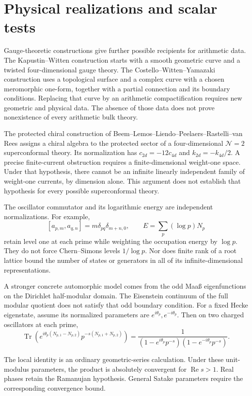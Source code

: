 \section{Physical realizations and scalar tests}
\label{v4-arith:ic:physical}

Gauge-theoretic constructions give further possible recipients
for arithmetic data.
The Kapustin--Witten construction starts with a smooth geometric
curve and a twisted four-dimensional gauge theory.
The Costello--Witten--Yamazaki construction uses a topological
surface and a complex curve with a chosen meromorphic one-form,
together with a partial connection and its boundary conditions.
Replacing that curve by an arithmetic compactification requires
new geometric and physical data.
The absence of those data does not prove nonexistence of every
arithmetic bulk theory.

The protected chiral construction of
Beem--Lemos--Liendo--Peelaers--Rastelli--van Rees assigns a chiral
algebra to the protected sector of a four-dimensional
\(\mathcal N=2\) superconformal theory.
Its normalization has
\(c_{2d}=-12c_{4d}\) and \(k_{2d}=-k_{4d}/2\).
A precise finite-current obstruction requires a finite-dimensional
weight-one space. Under that hypothesis, there cannot be an
infinite linearly independent family of weight-one currents,
by dimension alone.
This argument does not establish that hypothesis for every
possible superconformal theory.

The oscillator commutator and its logarithmic energy are independent
normalizations. For example,
\[
 [a_{p,m},a_{q,n}]
   =m\delta_{pq}\delta_{m+n,0},
 \qquad
 E=\sum_p(\log p)N_p
\]
retain level one at each prime while weighting the occupation
energy by \(\log p\).
They do not force Chern--Simons levels \(1/\log p\).
Nor does finite rank of a root lattice bound the number of states
or generators in all of its infinite-dimensional representations.

A stronger concrete automorphic model comes from the odd
Maaß eigenfunctions on the Dirichlet half-modular domain.
The Eisenstein continuum of the full modular quotient does not
satisfy that odd boundary condition.
For a fixed Hecke eigenstate, assume its normalized parameters
are \(e^{i\theta_p},e^{-i\theta_p}\).
Then on two charged oscillators at each prime,
\[
 \operatorname{Tr}\!
 \left(e^{i\theta_p(N_{p,1}-N_{p,2})}
       p^{-s(N_{p,1}+N_{p,2})}\right)
 =
 \frac1{(1-e^{i\theta_p}p^{-s})
          (1-e^{-i\theta_p}p^{-s})}.
\]

The local identity is an ordinary geometric-series calculation.
Under these unit-modulus parameters, the product is absolutely
convergent for \(\operatorname{Re}s>1\).
Real phases retain the Ramanujan hypothesis. General Satake
parameters require the corresponding convergence bound.

